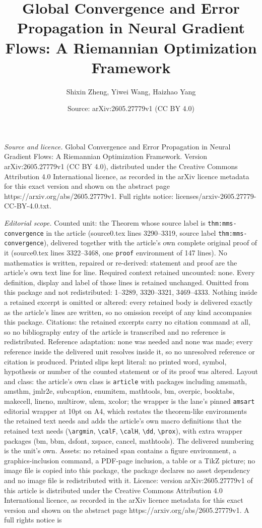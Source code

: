 \documentclass[10pt,a4paper]{amsart}
\title[Global Convergence and Error Propagation in Neural Gradient ]{Global Convergence and Error Propagation in Neural Gradient Flows: A Riemannian Optimization Framework}
\author{Shixin Zheng, Yiwei Wang, Haizhao Yang}
\date{Source: arXiv:2605.27779v1 (CC BY 4.0)}
\begin{document}
\maketitle

\noindent\emph{Source and licence.} Global Convergence and Error Propagation in Neural Gradient Flows: A Riemannian Optimization Framework. Version arXiv:2605.27779v1 (CC BY 4.0), distributed under the Creative Commons Attribution 4.0 International licence, as recorded in the arXiv licence metadata for this exact version and shown on the abstract page https://arxiv.org/abs/2605.27779v1. Full rights notice: licenses/arxiv-2605.27779-CC-BY-4.0.txt.\par\smallskip

\noindent\textit{Editorial scope.} Counted unit: the Theorem whose source label is \texttt{thm:mms-convergence} in the article (source0.tex lines 3290--3319, source label \texttt{thm:mms-convergence}), delivered together with the article's own complete original proof of it (source0.tex lines 3322--3468, one \texttt{proof} environment of 147 lines). No mathematics is written, repaired or re-derived: statement and proof are the article's own text line for line. Required context retained uncounted: none. Every definition, display and label of those lines is retained unchanged. Omitted from this package and not redistributed: 1--3289, 3320--3321, 3469--4333. Nothing inside a retained excerpt is omitted or altered: every retained body is delivered exactly as the article's lines are written, so no omission receipt of any kind accompanies this package. Citations: the retained excerpts carry no citation command at all, so no bibliography entry of the article is transcribed and no reference is redistributed. Reference adaptation: none was needed and none was made; every reference inside the delivered unit resolves inside it, so no unresolved reference or citation is produced. Printed slips kept literal: no printed word, symbol, hypothesis or number of the counted statement or of its proof was altered. Layout and class: the article's own class is \texttt{article} with packages including amsmath, amsthm, jmlr2e, subcaption, enumitem, mathtools, bm, overpic, booktabs, makecell, lineno, multirow, ulem, xcolor; the wrapper is the lane's pinned \texttt{amsart} editorial wrapper at 10pt on A4, which restates the theorem-like environments the retained text needs and adds the article's own macro definitions that the retained text needs (\texttt{\textbackslash argmin}, \texttt{\textbackslash calF}, \texttt{\textbackslash calH}, \texttt{\textbackslash dd}, \texttt{\textbackslash prox}), with extra wrapper packages (bm, bbm, dsfont, xspace, cancel, mathtools). The delivered numbering is the unit's own. Assets: no retained span contains a figure environment, a graphics-inclusion command, a PDF-page inclusion, a table or a TikZ picture; no image file is copied into this package, the package declares no asset dependency and no image file is redistributed with it. Licence: version arXiv:2605.27779v1 of this article is distributed under the Creative Commons Attribution 4.0 International licence, as recorded in the arXiv licence metadata for this exact version and shown on the abstract page https://arxiv.org/abs/2605.27779v1. A full rights notice is 
\end{document}
